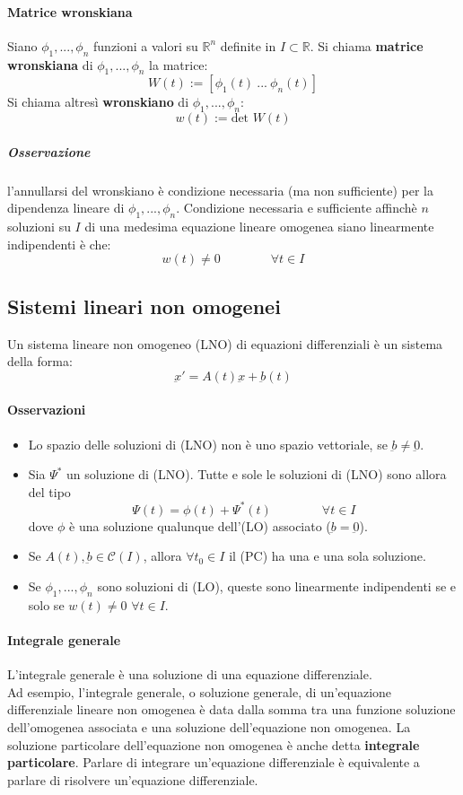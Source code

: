 \documentclass[a4paper,12pt]{article}
\newcommand{\cont}{\mathscr{C}}
\begin{document}
\paragraph{Matrice wronskiana}
Siano $\phi_1,...,\phi_n$ funzioni a valori su $\mathbb{R}^n$ definite in $I\subset \mathbb{R}$.
Si chiama \textbf{matrice wronskiana} di $\phi_1,...,\phi_n$ la matrice:
$$W(t):=[\phi_1(t)\ ...\ \phi_n(t)]$$
Si chiama altresì \textbf{wronskiano} di $\phi_1,...,\phi_n$:
$$w(t):=\text{det } W(t)$$
\subparagraph*{Osservazione} l'annullarsi del wronskiano è condizione necessaria (ma non sufficiente) per la dipendenza lineare di $\phi_1,...,\phi_n$. 
Condizione necessaria e sufficiente affinchè $n$ soluzioni su $I$ di una medesima equazione lineare omogenea siano linearmente indipendenti è che:
$$ w(t)\neq0 \qquad\qquad \forall t \in I$$

\subsection{Sistemi lineari non omogenei}
Un sistema lineare non omogeneo (LNO) di equazioni differenziali è un sistema della forma:
$$\underbar{x}' = A(t)\underbar{x} + \underbar{b}(t)$$
\paragraph{Osservazioni}
\begin{itemize}
 \item Lo spazio delle soluzioni di (LNO) non è uno spazio vettoriale, se $\underbar{b}\neq\underbar{0}$.
 \item Sia $\Psi^*$ un soluzione di (LNO). Tutte e sole le soluzioni di (LNO) sono allora del tipo
       $$ \Psi(t) = \phi(t) + \Psi^*(t)\qquad \qquad \forall t \in I$$
       dove $\phi$ è una soluzione qualunque dell'(LO) associato ($\underbar{b}=\underbar{0}$).
 \item Se $A(t) , \underbar{b}\in \cont(I)$, allora $ \forall t_0 \in I$ il (PC)  ha una e una sola soluzione.
 \item Se $\phi_1,...,\phi_n$ sono soluzioni di (LO), queste sono linearmente indipendenti se e solo se $w(t)\neq0$ $\forall t \in I$.
\end{itemize}


\paragraph{Integrale generale}
L'integrale generale è una soluzione di una equazione differenziale.\\
Ad esempio, l'integrale generale, o soluzione generale, di un'equazione differenziale lineare non omogenea è data dalla somma tra una funzione soluzione dell'omogenea associata e una soluzione dell'equazione non omogenea. La soluzione particolare dell'equazione non omogenea è anche detta \textbf{integrale particolare}. Parlare di integrare un'equazione differenziale è equivalente a parlare di risolvere un'equazione differenziale.
\end{document}
